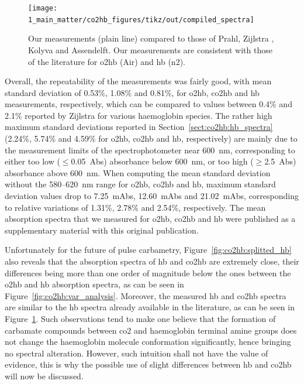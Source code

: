 \begin{figure}
	\centering
	\texttt{[image: 1\_main\_matter/co2hb\_figures/tikz/out/compiled\_spectra]}
	\caption[Obtained haemoglobin spectra: comparison with the literature.]{Our measurements (plain line) compared to those of Prahl\cite{prahl1998}, Zijlstra \etal\cite{zijlstra2000}, Kolyva \etal\cite{kolyva2012} and Assendelft\cite{assendelft1970}. Our measurements are consistent with those of the literature for \gls{o2hb} (Air) and \gls{hb} (\gls{n2}).}
	\label{fig:co2hb:compiled_spectra}
\end{figure}

Overall, the repeatability of the measurements was fairly good, with mean standard deviation of 0.53\%, 1.08\% and 0.81\%, for \gls{o2hb}, \gls{co2hb} and \gls{hb} measurements, respectively, which can be compared to values between 0.4\% and 2.1\% reported by Zijlstra \etal{} for various haemoglobin species\cite[Table~8.3]{zijlstra2000}. The rather high maximum standard deviations reported in Section~\ref{sect:co2hb:hb_spectra} (2.24\%, 5.74\% and 4.59\% for \gls{o2hb}, \gls{co2hb} and \gls{hb}, respectively) are mainly due to the measurement limits of the spectrophotometer near 600~nm, corresponding to either too low ($\leq$0.05~Abs) absorbance below 600~nm, or too high ($\geq$2.5~Abs) absorbance above 600~nm. When computing the mean standard deviation without the 580--620~nm range for \gls{o2hb}, \gls{co2hb} and \gls{hb}, maximum standard deviation values drop to 7.25~mAbs, 12.60~mAbs and 21.02~mAbs, corresponding to relative variations of 1.31\%, 2.78\% and 2.54\%, respectively. The mean absorption spectra that we measured for {\gls{o2hb}}, {\gls{co2hb}} and {\gls{hb}} were published as a supplementary material with this original publication\cite{dervieux2020}.

Unfortunately for the future of pulse carbametry, Figure~\ref{fig:co2hb:splitted_hb} also reveals that the absorption spectra of \gls{hb} and \gls{co2hb} are extremely close, their differences being more than one order of magnitude below the ones between the \gls{o2hb} and \gls{hb} absorption spectra, as can be seen in Figure~\ref{fig:co2hb:var_analysis}. Moreover, the measured \gls{hb} and \gls{co2hb} spectra are similar to the \gls{hb} spectra already available in the literature, as can be seen in Figure~\ref{fig:co2hb:compiled_spectra}. Such observations tend to make one believe that the formation of carbamate compounds between \gls{co2} and haemoglobin terminal amine groups does not change the haemoglobin molecule conformation significantly, hence bringing no spectral alteration. However, such intuition shall not have the value of evidence, this is why the possible use of slight differences between \gls{hb} and \gls{co2hb} will now be discussed.


